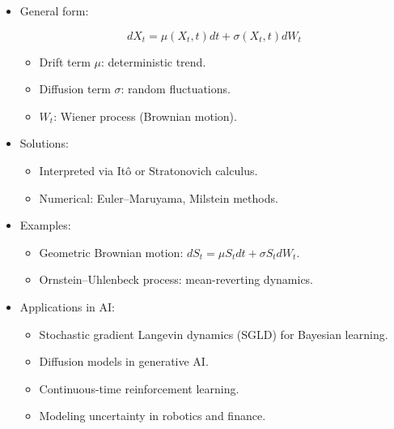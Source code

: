 \documentclass[
  letterpaper,
  DIV=11,
  numbers=noendperiod]{scrreprt}
\providecommand{\tightlist}{%
  \setlength{\itemsep}{0pt}\setlength{\parskip}{0pt}}
\begin{document}
\begin{itemize}
\item
  General form:

  \[
  dX_t = \mu(X_t, t)dt + \sigma(X_t, t)dW_t
  \]

  \begin{itemize}
  \tightlist
  \item
    Drift term \(\mu\): deterministic trend.
  \item
    Diffusion term \(\sigma\): random fluctuations.
  \item
    \(W_t\): Wiener process (Brownian motion).
  \end{itemize}
\item
  Solutions:

  \begin{itemize}
  \tightlist
  \item
    Interpreted via Itô or Stratonovich calculus.
  \item
    Numerical: Euler--Maruyama, Milstein methods.
  \end{itemize}
\item
  Examples:

  \begin{itemize}
  \tightlist
  \item
    Geometric Brownian motion: \(dS_t = \mu S_t dt + \sigma S_t dW_t\).
  \item
    Ornstein--Uhlenbeck process: mean-reverting dynamics.
  \end{itemize}
\item
  Applications in AI:

  \begin{itemize}
  \tightlist
  \item
    Stochastic gradient Langevin dynamics (SGLD) for Bayesian learning.
  \item
    Diffusion models in generative AI.
  \item
    Continuous-time reinforcement learning.
  \item
    Modeling uncertainty in robotics and finance.
  \end{itemize}
\end{itemize}
\end{document}
